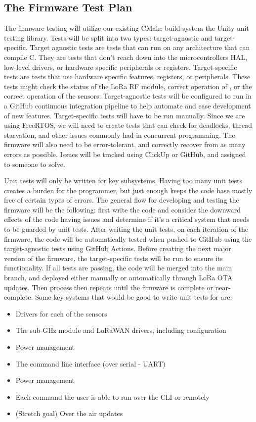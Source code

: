 \subsection{The Firmware Test Plan}
The firmware testing will utilize our existing CMake build system the Unity unit
testing library. Tests will be split into two types: target-agnostic and
target-specific. Target agnostic tests are tests that can run on any
architecture that can compile C. They are tests that don't reach down
into the microcontrollers HAL, low-level drivers, or hardware specific
peripherals or registers. Target-specific tests are tests that use hardware
specific features, registers, or peripherals. These tests might check the status
of the LoRa RF module, correct operation of \iic, or the correct operation of
the sensors. Target-agnostic tests will be configured to run in a GitHub
continuous integration pipeline to help automate and ease development of new
features. Target-specific tests will have to be run manually. Since we are using
FreeRTOS, we will need to create tests that can check for deadlocks, thread
starvation, and other issues commonly had in concurrent programming. The
firmware will also need to be error-tolerant, and correctly recover from as many
errors as possible. Issues will be tracked using ClickUp or GitHub, and assigned
to someone to solve.

Unit tests will only be written for key subsystems. Having too many unit tests
creates a burden for the programmer, but just enough keeps the code base mostly
free of certain types of errors. The general flow for developing and testing the
firmware will be the following: first write the code and consider the downward
effects of the code having issues and determine if it's a critical system that
needs to be guarded by unit tests. After writing the unit tests, on each
iteration of the firmware, the code will be automatically tested when pushed to
GitHub using the target-agnostic tests using GitHub Actions. Before creating the
next major version of the firmware, the target-specific tests will be run to
ensure its functionality. If all tests are passing, the code will be merged into
the main branch, and deployed either manually or automatically through LoRa OTA
updates. Then process then repeats until the firmware is complete or
near-complete. Some key systems that would be good to write unit tests for are:

\begin{itemize}
  \item Drivers for each of the sensors
  \item The sub-GHz module and LoRaWAN drivers, including configuration
  \item Power management
  \item The command line interface (over serial - UART)
  \item Power management
  \item Each command the user is able to run over the CLI or remotely
  \item (Stretch goal) Over the air updates
\end{itemize}

